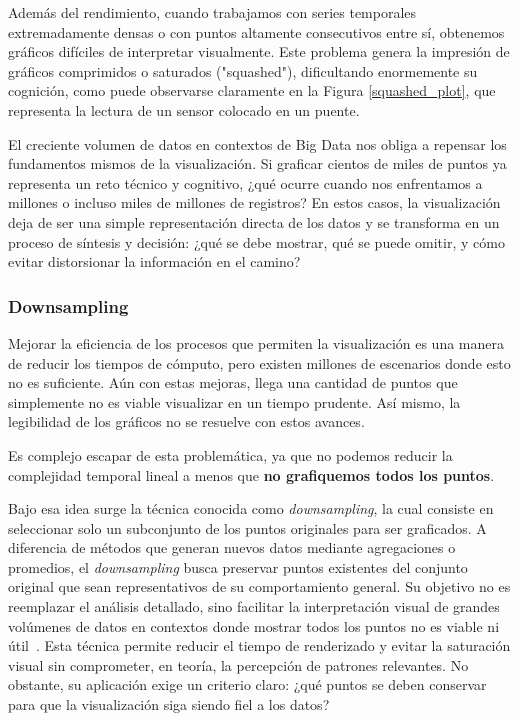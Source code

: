 Además del rendimiento, cuando trabajamos con series temporales extremadamente densas o con puntos altamente consecutivos entre sí, obtenemos gráficos difíciles de interpretar visualmente. Este problema genera la impresión de gráficos comprimidos o saturados ("squashed"), dificultando enormemente su cognición, como puede observarse claramente en la Figura \ref{squashed_plot}, que representa la lectura de un sensor colocado en un puente.

El creciente volumen de datos en contextos de Big Data nos obliga a repensar los fundamentos mismos de la visualización. Si graficar cientos de miles de puntos ya representa un reto técnico y cognitivo, ¿qué ocurre cuando nos enfrentamos a millones o incluso miles de millones de registros? En estos casos, la visualización deja de ser una simple representación directa de los datos y se transforma en un proceso de síntesis y decisión: ¿qué se debe mostrar, qué se puede omitir, y cómo evitar distorsionar la información en el camino?

\subsubsection{Downsampling}

Mejorar la eficiencia de los procesos que permiten la visualización es una manera de reducir los tiempos de cómputo, pero existen millones de escenarios donde esto no es suficiente. Aún con estas mejoras, llega una cantidad de puntos que simplemente no es viable visualizar en un tiempo prudente. Así mismo, la legibilidad de los gráficos no se resuelve con estos avances.

Es complejo escapar de esta problemática, ya que no podemos reducir la complejidad temporal lineal a menos que \textbf{no grafiquemos todos los puntos}.

Bajo esa idea surge la técnica conocida como \textit{downsampling}, la cual consiste en seleccionar solo un subconjunto de los puntos originales para ser graficados. A diferencia de métodos que generan nuevos datos mediante agregaciones o promedios, el \textit{downsampling} busca preservar puntos existentes del conjunto original que sean representativos de su comportamiento general. Su objetivo no es reemplazar el análisis detallado, sino facilitar la interpretación visual de grandes volúmenes de datos en contextos donde mostrar todos los puntos no es viable ni útil~\cite{steinarsson2013downsampling}. Esta técnica permite reducir el tiempo de renderizado y evitar la saturación visual sin comprometer, en teoría, la percepción de patrones relevantes. No obstante, su aplicación exige un criterio claro: ¿qué puntos se deben conservar para que la visualización siga siendo fiel a los datos?

